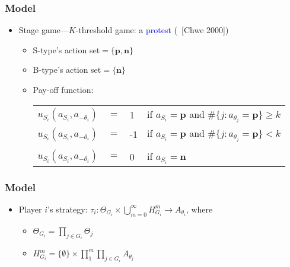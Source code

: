\documentclass[8pt]{beamer}
\begin{document}
\begin{frame}
  \frametitle{Model}

  \begin{itemize}

  \item Stage game---\alert{$K$}-threshold game: a \textcolor{blue}{protest} (~[Chwe 2000])




\begin{itemize}
\item S-type's action set$=\{\textbf{p},\textbf{n}\}$
\item B-type's action set$=\{\textbf{n}\}$
\item Pay-off function:
\begin{table}[h]
\begin{tabular}{llll}
$u_{S_i}(a_{S_i},a_{-\theta_i})$ & $=$ & 1 & if $a_{S_i}=\textbf{p}$ and $\#\{j:a_{\theta_j}=\textbf{p}\}\geq {k}$ \\
$u_{S_i}(a_{S_i},a_{-\theta_i})$ & $=$ & -1 & if $a_{S_i}=\textbf{p}$ and $\#\{j:a_{\theta_j}=\textbf{p}\}< {k}$ \\
\\
$u_{S_i}(a_{S_i},a_{-\theta_i})$ & $=$ & 0 & if $a_{S_i}=\textbf{n}$ 
\end{tabular}

\end{table}
\end{itemize}
  

 \end{itemize}

\end{frame}



\begin{frame}
  \frametitle{Model}

  \begin{itemize}

  \item Player $i$'s strategy: $\tau_i:\Theta_{G_i}\times \bigcup^{\infty}_{m=0} H^{m}_{G_i} \rightarrow A_{\theta_i}$, where
  \begin{itemize}
\item $\Theta_{G_i}=\prod_{j\in G_i}\Theta_j$
\item $H^m_{G_i}=\{\emptyset\}\times\prod^{m}_{1}\prod_{j\in G_i}A_{\theta_j}$

  \end{itemize}
  
  
\end{itemize}
  



\end{frame}
\end{document}
